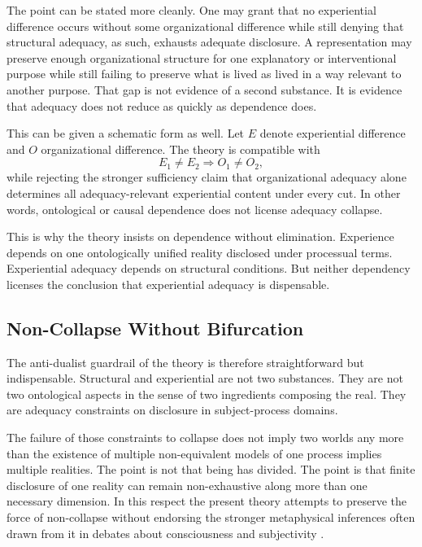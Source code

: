 \documentclass[11pt]{article}
\begin{document}
The point can be stated more cleanly. One may grant that no experiential difference occurs without some organizational difference while still denying that structural adequacy, as such, exhausts adequate disclosure. A representation may preserve enough organizational structure for one explanatory or interventional purpose while still failing to preserve what is lived as lived in a way relevant to another purpose. That gap is not evidence of a second substance. It is evidence that adequacy does not reduce as quickly as dependence does.

This can be given a schematic form as well. Let \(E\) denote experiential difference and \(O\) organizational difference. The theory is compatible with
\[
E_1 \neq E_2 \Rightarrow O_1 \neq O_2,
\]
while rejecting the stronger sufficiency claim that organizational adequacy alone determines all adequacy-relevant experiential content under every cut. In other words, ontological or causal dependence does not license adequacy collapse.

This is why the theory insists on dependence without elimination. Experience depends on one ontologically unified reality disclosed under processual terms. Experiential adequacy depends on structural conditions. But neither dependency licenses the conclusion that experiential adequacy is dispensable.

\subsection{Non-Collapse Without Bifurcation}

The anti-dualist guardrail of the theory is therefore straightforward but indispensable. Structural and experiential are not two substances. They are not two ontological aspects in the sense of two ingredients composing the real. They are adequacy constraints on disclosure in subject-process domains.

The failure of those constraints to collapse does not imply two worlds any more than the existence of multiple non-equivalent models of one process implies multiple realities. The point is not that being has divided. The point is that finite disclosure of one reality can remain non-exhaustive along more than one necessary dimension. In this respect the present theory attempts to preserve the force of non-collapse without endorsing the stronger metaphysical inferences often drawn from it in debates about consciousness and subjectivity \cite{Nagel1974,Levine1983,Chalmers1995}.
\end{document}
